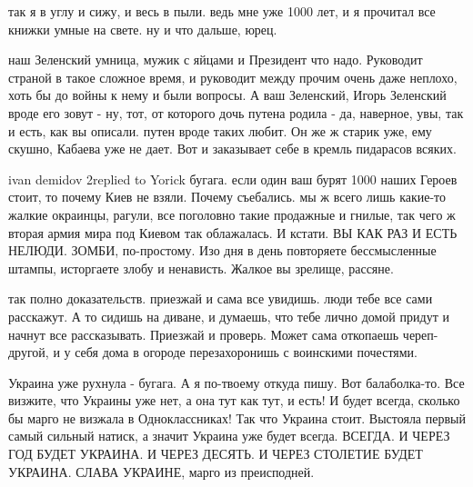 так я в углу и сижу, и весь в пыли. ведь мне уже 1000 лет, и я прочитал все
книжки умные на свете. ну и что дальше, юрец.

наш Зеленский умница, мужик с яйцами и Президент что надо. Руководит страной в
такое сложное время, и руководит между прочим очень даже неплохо, хоть бы до
войны к нему и были вопросы. А ваш Зеленский, Игорь Зеленский вроде его зовут -
ну, тот, от которого дочь путена родила - да, наверное, увы, так и есть, как вы
описали. путен вроде таких любит. Он же ж старик уже, ему скушно, Кабаева уже
не дает. Вот и заказывает себе в кремль пидарасов всяких.

ivan demidov 2replied to Yorick бугага. если один ваш бурят 1000 наших Героев
стоит, то почему Киев не взяли. Почему съебались. мы ж всего лишь какие-то
жалкие окраинцы, рагули, все поголовно такие продажные и гнилые, так чего ж
вторая армия мира под Киевом так облажалась. И кстати. ВЫ КАК РАЗ И ЕСТЬ
НЕЛЮДИ. ЗОМБИ, по-простому. Изо дня в день повторяете бессмысленные штампы,
исторгаете злобу и ненависть. Жалкое вы зрелище, рассяне.

так полно доказательств. приезжай и сама все увидишь. люди тебе все сами
расскажут. А то сидишь на диване, и думаешь, что тебе лично домой придут и
начнут все рассказывать. Приезжай и проверь. Может сама откопаешь череп-другой,
и у себя дома в огороде перезахоронишь с воинскими почестями.

Украина уже рухнула - бугага. А я по-твоему откуда пишу. Вот балаболка-то. Все
визжите, что Украины уже нет, а она тут как тут, и есть! И будет всегда,
сколько бы марго не визжала в Одноклассниках! Так что Украина стоит. Выстояла
первый самый сильный натиск, а значит Украина уже будет всегда. ВСЕГДА. И ЧЕРЕЗ
ГОД БУДЕТ УКРАИНА. И ЧЕРЕЗ ДЕСЯТЬ. И ЧЕРЕЗ СТОЛЕТИЕ БУДЕТ УКРАИНА. СЛАВА
УКРАИНЕ, марго из преисподней.

